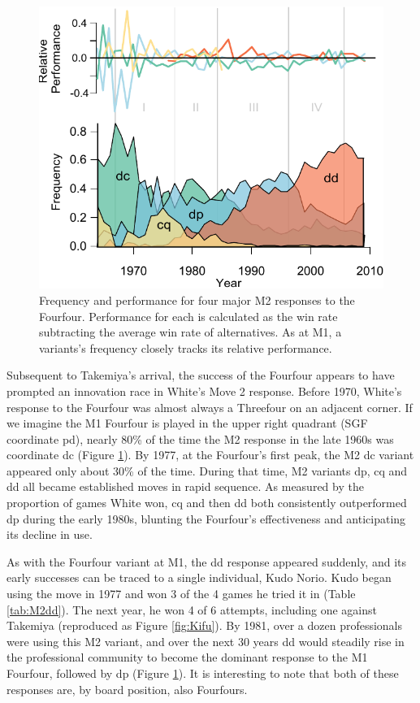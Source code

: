  \begin{figure}[t]
\begin{center} 
\includegraphics[scale=1.0]{figures/gofirstmove/figM2FreqsWins.pdf}
\caption{Frequency and performance for four major M2 responses to the Fourfour.  Performance for each is calculated as the win rate subtracting the average win rate of alternatives.  As at M1, a variants's frequency closely tracks its relative performance.}
\label{fig:M2FreqsWins}
\end{center}
\end{figure}

Subsequent to Takemiya's arrival, the success of the Fourfour appears to have prompted an innovation race in White's Move 2 response.  Before 1970, White's response to the  Fourfour was almost always a Threefour on an adjacent corner.  If we imagine the M1 Fourfour is played in the upper right quadrant (SGF coordinate pd), nearly 80\% of the time the M2 response in the late 1960s was coordinate dc (Figure \ref{fig:M2FreqsWins}).  By 1977, at the Fourfour's first peak, the M2 dc variant appeared only about 30\% of the time.  During that time, M2 variants dp, cq and dd all became established moves in rapid sequence.  As measured by the proportion of games White won, cq and then dd both consistently outperformed dp during the early 1980s, blunting the Fourfour's effectiveness and anticipating its decline in use.

As with the Fourfour variant at M1, the dd response appeared suddenly, and its early successes can be traced to a single individual, Kudo Norio.  Kudo began using the move in 1977 and won 3 of the 4 games he tried it in (Table \ref{tab:M2dd}).  The next year, he won 4 of 6 attempts, including one against Takemiya (reproduced as Figure \ref{fig:Kifu}).  By 1981, over a dozen professionals were using this M2 variant, and over the next 30 years dd would steadily rise in the professional community to become the dominant response to the M1 Fourfour, followed by dp (Figure \ref{fig:M2FreqsWins}).  It is interesting to note that both of these responses are, by board position, also Fourfours.  

